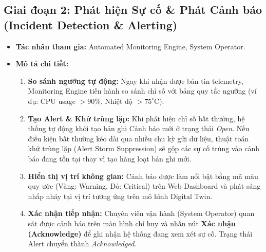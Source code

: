 \subsection{Giai đoạn 2: Phát hiện Sự cố \& Phát Cảnh báo (Incident Detection \& Alerting)}
\begin{itemize}
    \item \textbf{Tác nhân tham gia:} Automated Monitoring Engine, System Operator.
    \item \textbf{Mô tả chi tiết:}
    \begin{enumerate}
        \item \textbf{So sánh ngưỡng tự động:} Ngay khi nhận được bản tin telemetry, Monitoring Engine tiến hành so sánh chỉ số với bảng quy tắc ngưỡng (ví dụ: CPU usage $> 90\%$, Nhiệt độ $> 75^\circ\text{C}$).
        \item \textbf{Tạo Alert \& Khử trùng lặp:} Khi phát hiện chỉ số bất thường, hệ thống tự động khởi tạo bản ghi Cảnh báo mới ở trạng thái \textit{Open}. Nếu điều kiện bất thường kéo dài qua nhiều chu kỳ gửi dữ liệu, thuật toán khử trùng lặp (Alert Storm Suppression) sẽ gộp các sự cố trùng vào cảnh báo đang tồn tại thay vì tạo hàng loạt bản ghi mới.
        \item \textbf{Hiển thị vị trí không gian:} Cảnh báo được làm nổi bật bằng mã màu quy ước (Vàng: Warning, Đỏ: Critical) trên Web Dashboard và phát sáng nhấp nháy tại vị trí tương ứng trên mô hình Digital Twin.
        \item \textbf{Xác nhận tiếp nhận:} Chuyên viên vận hành (System Operator) quan sát được cảnh báo trên màn hình chỉ huy và nhấn nút \textbf{Xác nhận (Acknowledge)} để ghi nhận hệ thống đang xem xét sự cố. Trạng thái Alert chuyển thành \textit{Acknowledged}.
    \end{enumerate}
\end{itemize}


